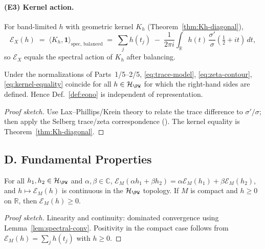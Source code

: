\paragraph{(E3) Kernel action.}
For band-limited $h$ with geometric kernel $K_h$ (Theorem~\ref{thm:Kh-diagonal}),
\begin{equation}
\label{eq:kernel-equality}
  \mathcal E_X(h) \;=\; \langle K_h, \mathbf 1\rangle_{\mathrm{spec,\,balanced}}
  \;=\; \sum_j h(t_j) \;-\; \frac{1}{2\pi i}\!\int_{\mathbb R} h(t)\,\frac{\sigma'}{\sigma}(\tfrac12+it)\,dt,
\end{equation}
so $\mathcal E_X$ equals the spectral action of $K_h$ after balancing.

\begin{proposition}[Equivalence of (E1)–(E3)]
\label{prop:equiv}
Under the normalizations of Parts~1/5–2/5, \eqref{eq:trace-model}, \eqref{eq:zeta-contour}, \eqref{eq:kernel-equality} coincide for all $h\in\mathcal H_{\PW}$ for which the right-hand sides are defined. Hence Def.~\ref{def:eono} is independent of representation.
\end{proposition}

\begin{proof}[Proof sketch]
Use Lax–Phillips/Krein theory to relate the trace difference to $\sigma'/\sigma$; then apply the Selberg trace/zeta correspondence (\cite{Hejhal1983,Hejhal1983II}). The kernel equality is Theorem~\ref{thm:Kh-diagonal}.
\end{proof}


\subsection*{D. Fundamental Properties}
\label{subsec:properties}

\begin{theorem}
\label{thm:props-basic}
For all $h_1,h_2\in\mathcal H_{\PW}$ and $\alpha,\beta\in\mathbb C$,
$\mathcal E_M(\alpha h_1+\beta h_2)=\alpha \mathcal E_M(h_1)+\beta \mathcal E_M(h_2)$, and $h\mapsto \mathcal E_M(h)$ is continuous in the $\mathcal H_{\PW}$ topology. If $M$ is compact and $h\ge 0$ on $\mathbb R$, then $\mathcal E_M(h)\ge 0$.
\end{theorem}

\begin{proof}[Proof sketch]
Linearity and continuity: dominated convergence using Lemma~\ref{lem:spectral-conv}. Positivity in the compact case follows from $\mathcal E_M(h)=\sum_j h(t_j)$ with $h\ge 0$.
\end{proof}

